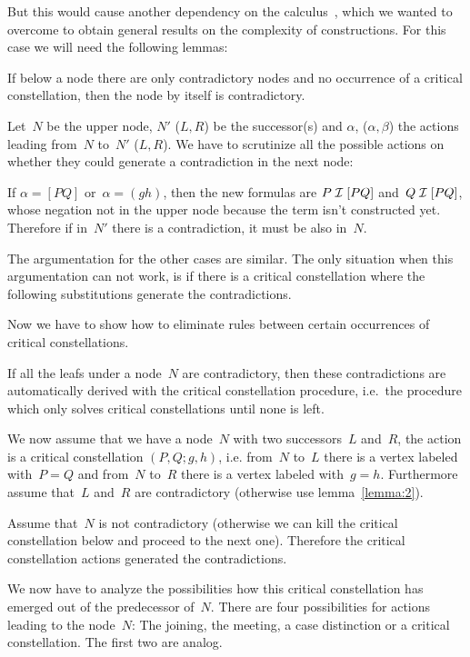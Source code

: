 But this would cause another dependency on the calculus~\pelk, which we
wanted to overcome to obtain general results on the complexity of
constructions. For this case we will need the following lemmas:

\begin{lemma}\label{lemma:2}
If below a node there are only contradictory nodes and no occurrence of a
critical constellation, then the node by itself is contradictory. 
\end{lemma}

\beginproof Let~$N$ be the upper node, $N'$ ($L, R$) be the successor(s) and
 $\alpha$, ($\alpha, \beta$) the actions leading from~$N$ to~$N'$ ($L, R$).
We have to scrutinize all the possible actions on whether they could generate
a contradiction in the next node:

If $\alpha = [PQ]$ or~$\alpha = (gh)$, then the new formulas are $P\cI [PQ]$
and~$Q\cI [PQ]$, whose negation not in the upper
node because the term isn't constructed yet. Therefore if in~$N'$
there is a contradiction, it must be also in~$N$. 

The argumentation for the other cases are similar. The only situation when this
argumentation can not work, is if there is a critical constellation where the
following substitutions generate the contradictions.
\endproof

Now we have to show how to eliminate rules between certain occurrences
of critical constellations.

\begin{lemma}\label{lemma:3}
If all the leafs under a node~$N$ are contradictory, then these
contradictions are automatically derived with the critical constellation
procedure, i.e.\ the procedure which only solves critical constellations until
none is left.
\end{lemma}

\beginproof 
We now assume that we have a node~$N$ with two successors~$L$ and~$R$,
the action is a critical constellation $(P,Q;g,h)$, i.e. from~$N$
to~$L$ there is a vertex labeled with~$P=Q$ and from~$N$ to~$R$ there
is a vertex labeled with~$g=h$. Furthermore assume that~$L$ and~$R$
are contradictory (otherwise use lemma~\ref{lemma:2}).

Assume that~$N$ is not contradictory (otherwise we can kill the
critical constellation below and proceed to the next one). Therefore
the critical constellation actions generated the contradictions.

We now have to analyze the possibilities how this critical
constellation has emerged out of the predecessor of~$N$. There are
four possibilities for actions leading to the node~$N$: The joining,
the meeting, a case distinction or a critical constellation. The first
two are analog.

